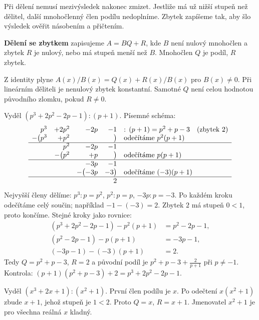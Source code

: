 \documentclass[11pt,a4paper]{article}
\begin{document}

Při dělení nemusí mezivýsledek nakonec zmizet. Jestliže má už nižší stupeň než dělitel, další mnohočlenný člen podílu nedoplníme. Zbytek zapíšeme tak, aby šlo výsledek ověřit násobením a přičtením.

\begin{definiceBox}[title={Definice},breakable=false]
\textbf{Dělení se zbytkem} zapisujeme $A=BQ+R$, kde $B$ není nulový mnohočlen a zbytek $R$ je nulový, nebo má stupeň menší než $B$. Mnohočlen $Q$ je podíl, $R$ zbytek.
\end{definiceBox}


Z identity plyne $A(x)/B(x)=Q(x)+R(x)/B(x)$ pro $B(x)\ne0$. Při lineárním děliteli je nenulový zbytek konstantní. Samotné $Q$ není celou hodnotou původního zlomku, pokud $R\ne0$.


\begin{prikladReseniBox}[title={Příklad 1},breakable=false]
Vyděl $(p^3+2p^2-2p-1):(p+1)$.
\tcblower
Písemné schéma:
\[
\begin{array}{r r r r l}
 p^3&+2p^2&-2p&-1&:\,(p+1)=p^2+p-3\quad\text{(zbytek }2\text{)}\\
 -\bigl(p^3&+p^2&&\bigr)&\text{odečítáme }p^2(p+1)\\ \hline
 &p^2&-2p&-1&\\
 &-\bigl(p^2&+p&\bigr)&\text{odečítáme }p(p+1)\\ \hline
 &&-3p&-1&\\
 &&-\bigl(-3p&-3\bigr)&\text{odečítáme }(-3)(p+1)\\ \hline
 &&&2&
\end{array}
\]
Nejvyšší členy dělíme: $p^3:p=p^2$, $p^2:p=p$, $-3p:p=-3$.
Po každém kroku odečítáme celý součin; například $-1-(-3)=2$.
Zbytek $2$ má stupeň $0<1$, proto končíme. Stejné kroky jako rovnice:
\begin{align*}
(p^3+2p^2-2p-1)-p^2(p+1)&=p^2-2p-1,\\
(p^2-2p-1)-p(p+1)&=-3p-1,\\
(-3p-1)-(-3)(p+1)&=2.
\end{align*}
Tedy $Q=p^2+p-3$, $R=2$ a původní podíl je $p^2+p-3+\frac2{p+1}$ při $p\ne-1$. Kontrola: $(p+1)(p^2+p-3)+2=p^3+2p^2-2p-1$.
\end{prikladReseniBox}


\begin{prikladReseniBox}[title={Příklad 2},breakable=false]
Vyděl $(x^3+2x+1):(x^2+1)$.
\tcblower
První člen podílu je $x$. Po odečtení $x(x^2+1)$ zbude $x+1$, jehož stupeň je $1<2$. Proto $Q=x$, $R=x+1$. Jmenovatel $x^2+1$ je pro všechna reálná $x$ kladný.
\end{prikladReseniBox}
\end{document}
